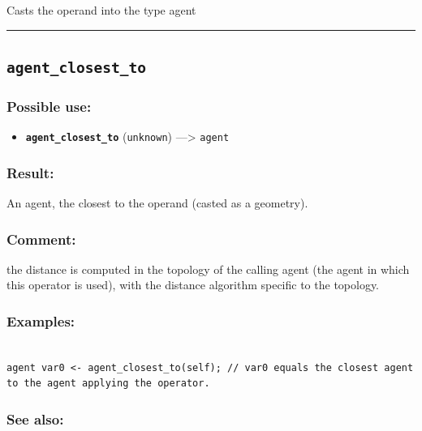 \documentclass[]{book}
\providecommand{\tightlist}{%
  \setlength{\itemsep}{0pt}\setlength{\parskip}{0pt}}
\theoremstyle{definition}
\theoremstyle{definition}
\theoremstyle{definition}
\theoremstyle{remark}
\begin{document}
Casts the operand into the type agent

\begin{center}\rule{0.5\linewidth}{\linethickness}\end{center}

\subsection{\texorpdfstring{\texttt{agent\_closest\_to}}{agent\_closest\_to}}\label{agent_closest_to}

\subsubsection{Possible use:}\label{possible-use-26}

\begin{itemize}
\tightlist
\item
  \textbf{\texttt{agent\_closest\_to}} (\texttt{unknown})
  ---\textgreater{} \texttt{agent}
\end{itemize}

\subsubsection{Result:}\label{result-25}

An agent, the closest to the operand (casted as a geometry).

\subsubsection{Comment:}\label{comment-4}

the distance is computed in the topology of the calling agent (the agent
in which this operator is used), with the distance algorithm specific to
the topology.

\subsubsection{Examples:}\label{examples-19}

\begin{verbatim}
 
agent var0 <- agent_closest_to(self); // var0 equals the closest agent to the agent applying the operator.
\end{verbatim}

\subsubsection{See also:}\label{see-also-18}
\end{document}
